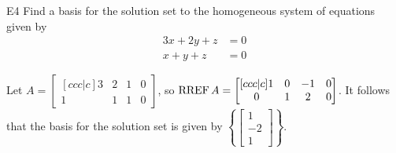 \documentclass{sbgLAsemi}
\begin{document}
\begin{problem}{E4}
Find a basis for the solution set to the homogeneous system of equations
given by
\begin{align*}
3x+2y+z &= 0 \\
x+y+z &= 0
\end{align*}
\end{problem}
\begin{solution}
Let \(A =
  \begin{bmatrix}[ccc|c]
    3 & 2 & 1 & 0 \\
    1 & 1 & 1 & 0
  \end{bmatrix}
\), so \(\operatorname{RREF} A =
  \begin{bmatrix}[ccc|c]
    1 & 0 & -1 & 0 \\
    0 & 1 & 2 & 0
  \end{bmatrix}
\).
It follows that the basis for the solution set is given by \(\left\{
  \begin{bmatrix}
    1 \\
    -2 \\
    1
  \end{bmatrix}
\right\}\).
\end{solution}
\end{document}
